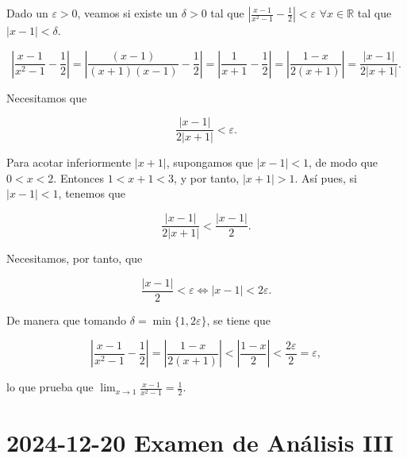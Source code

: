 \documentclass[
  spanish,
  a4paper,
]{scrreport}
\theoremstyle{definition}
\theoremstyle{remark}
\begin{document}
\begin{tcolorbox}[enhanced jigsaw, arc=.35mm, bottomrule=.15mm, bottomtitle=1mm, breakable, colback=white, colbacktitle=quarto-callout-tip-color!10!white, colframe=quarto-callout-tip-color-frame, coltitle=black, left=2mm, leftrule=.75mm, opacityback=0, opacitybacktitle=0.6, rightrule=.15mm, title=\textcolor{quarto-callout-tip-color}{\faLightbulb}\hspace{0.5em}{Solución}, titlerule=0mm, toprule=.15mm, toptitle=1mm]

Dado un \(\varepsilon>0\), veamos si existe un \(\delta>0\) tal que
\(|\frac{x-1}{x^2-1} -\frac{1}{2}|<\varepsilon\)
\(\forall x\in\mathbb{R}\) tal que \(|x-1|<\delta\).

\[
\left|\frac{x-1}{x^2-1} -\frac{1}{2}\right| 
= \left|\frac{(x-1)}{(x+1)(x-1)} -\frac{1}{2}\right| 
= \left|\frac{1}{x+1}-\frac{1}{2}\right|
= \left|\frac{1-x}{2(x+1)}\right|
= \frac{|x-1|}{2|x+1|}.
\]

Necesitamos que

\[
\frac{|x-1|}{2|x+1|}<\varepsilon.
\]

Para acotar inferiormente \(|x+1|\), supongamos que \(|x-1|<1\), de modo
que \(0<x<2\). Entonces \(1<x+1<3\), y por tanto, \(|x+1|>1\). Así pues,
si \(|x-1|<1\), tenemos que

\[
\frac{|x-1|}{2|x+1|} < \frac{|x-1|}{2}.
\]

Necesitamos, por tanto, que

\[
\frac{|x-1|}{2}<\varepsilon \Leftrightarrow |x-1|<2\varepsilon.
\]

De manera que tomando \(\delta = \min\{1,2\varepsilon\}\), se tiene que

\[
\left|\frac{x-1}{x^2-1} -\frac{1}{2}\right|
= \left|\frac{1-x}{2(x+1)}\right|
< \left|\frac{1-x}{2}\right|
< \frac{2\varepsilon}{2} 
= \varepsilon,
\]

lo que prueba que \(\lim_{x\to 1}\frac{x-1}{x^2-1} = \frac{1}{2}\).

\end{tcolorbox}


\chapter{\texorpdfstring{2024-12-20 Examen de Análisis
III}{2024-12-20  Examen de Análisis III}}\label{examen-de-anuxe1lisis-iii-3}
\end{document}
